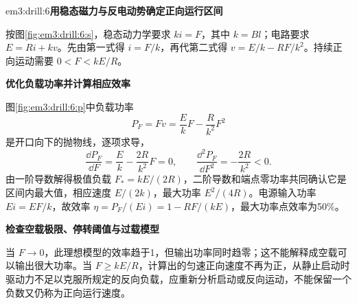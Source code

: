 \begin{drillsolution}{em3:drill:6}\textbf{用稳态磁力与反电动势确定正向运行区间}\par\nobreak
按图\ref{fig:em3:drill:6:s}，稳态动力学要求 $ki=F$，其中 $k=Bl$；电路要求 $E=Ri+kv$。先由第一式得 $i=F/k$，再代第二式得 $v=E/k-RF/k^2$。持续正向运动需要 $0<F<kE/R$。



\par\medskip{}\noindent\textbf{优化负载功率并计算相应效率}\par\nobreak
图\ref{fig:em3:drill:6:p}中负载功率
\[P_F=Fv=\frac EkF-\frac R{k^2}F^2\]
是开口向下的抛物线，逐项求导，
\[
\frac{\dd P_F}{\dd F}=\frac Ek-\frac{2R}{k^2}F=0,
\qquad \frac{\dd^2P_F}{\dd F^2}=-\frac{2R}{k^2}<0.
\]
由一阶导数解得极值负载 $F_*=kE/(2R)$，二阶导数和端点零功率共同确认它是区间内最大值，相应速度 $E/(2k)$，最大功率 $E^2/(4R)$。电源输入功率 $Ei=EF/k$，故效率 $\eta=P_F/(Ei)=1-RF/(kE)$，最大功率点效率为50\%。



\par\medskip{}\noindent\textbf{检查空载极限、停转阈值与过载模型}\par\nobreak
当 $F\to0$，此理想模型的效率趋于1，但输出功率同时趋零；这不能解释成空载可以输出很大功率。当 $F\ge kE/R$，计算出的匀速正向速度不再为正，从静止启动时驱动力不足以克服所规定的反向负载，应重新分析启动或反向运动，不能保留一个负数又仍称为正向运行速度。\end{drillsolution}


